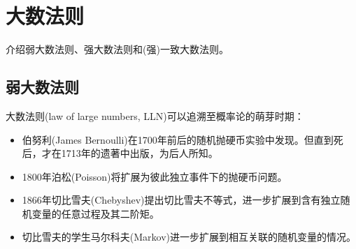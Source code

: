 \section{大数法则}
\label{sec:lln}
介绍弱大数法则、强大数法则和(强)一致大数法则。

\subsection{弱大数法则}
\label{sec:lln-wlln}
大数法则(law of large numbers, LLN)可以追溯至概率论的萌芽时期：
\begin{itemize}
  \item 伯努利(James Bernoulli)在1700年前后的随机抛硬币实验中发现。但直到死后，才在1713年的遗著中出版，为后人所知。
  \item 1800年泊松(Poisson)将扩展为彼此独立事件下的抛硬币问题。
  \item 1866年切比雪夫(Chebyshev)提出切比雪夫不等式，进一步扩展到含有独立随机变量的任意过程及其二阶矩。
  \item 切比雪夫的学生马尔科夫(Markov)进一步扩展到相互关联的随机变量的情况。
\end{itemize}

